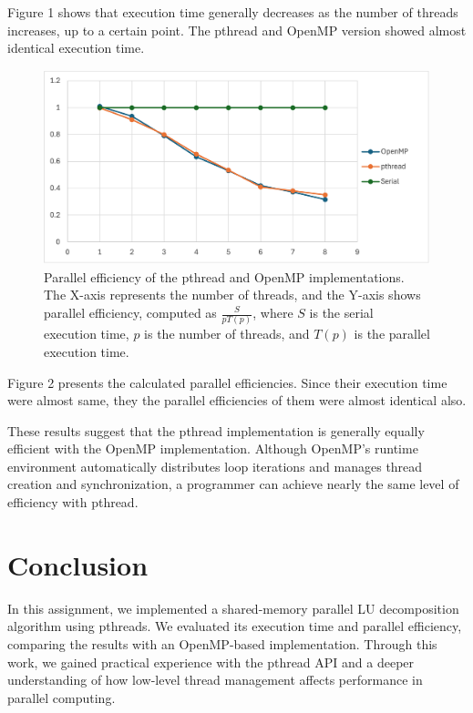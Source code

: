 \documentclass{article}
\begin{document}
Figure 1 shows that execution time generally decreases as the number of threads 
increases, up to a certain point. The pthread and OpenMP version showed almost
identical execution time.

\begin{figure}[h]
\centering
\includegraphics[width=.75\textwidth]{figure2.png}
\caption{
    Parallel efficiency of the pthread and OpenMP implementations. The X-axis 
    represents the number of threads, and the Y-axis shows parallel efficiency, 
    computed as $\frac{S}{pT(p)}$, where $S$ is the serial execution time, $p$ 
    is the number of threads, and $T(p)$ is the parallel execution time.
}
\end{figure}

Figure 2 presents the calculated parallel efficiencies. Since their execution 
time were almost same, they the parallel efficiencies of them were almost 
identical also.

These results suggest that the pthread implementation is generally equally 
efficient with the OpenMP implementation. Although OpenMP’s runtime environment 
automatically distributes loop iterations and manages thread creation and 
synchronization, a programmer can achieve nearly the same level of efficiency 
with pthread. 

\section{Conclusion}

In this assignment, we implemented a shared-memory parallel LU decomposition 
algorithm using pthreads. We evaluated its execution time and parallel 
efficiency, comparing the results with an OpenMP-based implementation. Through 
this work, we gained practical experience with the pthread API and a deeper 
understanding of how low-level thread management affects performance in parallel 
computing.
\end{document}
